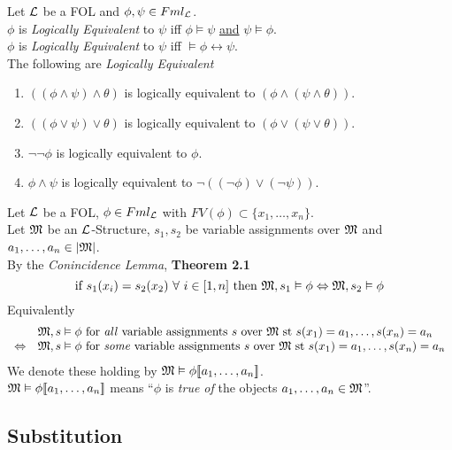 \documentclass[11pt,a4paper]{article}
\begin{document}
Let $\mathcal{L}$ be a FOL and $\phi,\psi\in Fml_{\mathcal{L}}$.\\
$\phi$ is \textit{Logically Equivalent} to $\psi$ iff
$\phi\vDash\psi$ \underline{and} $\psi\vDash\phi$.\\
\ie $\phi$ is \textit{Logically Equivalent} to $\psi$ iff $\vDash\phi\leftrightarrow\psi$.\\

The following are \textit{Logically Equivalent}
\begin{enumerate}
	\item $((\phi\wedge\psi)\wedge\theta)$ is logically equivalent to $(\phi\wedge(\psi\wedge\theta))$.
	\item $((\phi\vee\psi)\vee\theta)$ is logically equivalent to $(\phi\vee(\psi\vee\theta))$.
	\item $\neg\neg\phi$ is logically equivalent to $\phi$.
	\item $\phi\wedge\psi$ is logically equivalent to $\neg((\neg\phi)\vee(\neg\psi))$.
\end{enumerate}

Let $\mathcal{L}$ be a FOL, $\phi\in Fml_{\mathcal{L}}$ with $FV(\phi)\subset\{x_1,\dots,x_n\}$.\\
Let $\mathfrak{M}$ be an $\mathcal{L}$-Structure, $s_1,s_2$ be variable assignments over $\mathfrak{M}$ and $a_1,\dots,a_n\in|\mathfrak{M}|$.\\
By the \textit{Conincidence Lemma}, \textbf{Theorem 2.1}
$$\text{if }s_1(x_i)=s_2(x_2)\ \forall\ i\in[1,n]\text{ then }\M,s_1\vDash\phi\Leftrightarrow\M,s_2\vDash\phi$$
Equivalently
\[\begin{array}{rl}
&\mathfrak{M},s\vDash\phi\text{ for \textit{all} variable assignments }s\text{ over }\mathfrak{M}\text{ st }s(x_1)=a_1,\dots,s(x_n)=a_n\\
\Leftrightarrow&\mathfrak{M},s\vDash\phi\text{ for \textit{some} variable assignments }s\text{ over }\mathfrak{M}\text{ st }s(x_1)=a_1,\dots,s(x_n)=a_n
\end{array}\]
We denote these holding by $\mathfrak{M}\vDash\phi[\![a_1,\dots,a_n]\!]$.\\
\nb $\mathfrak{M}\vDash\phi[\![a_1,\dots,a_n]\!]$ means ``$\phi$ is \textit{true of} the objects $a_1,\dots,a_n\in\mathfrak{M}$''.\\

\subsection{Substitution}
\end{document}
